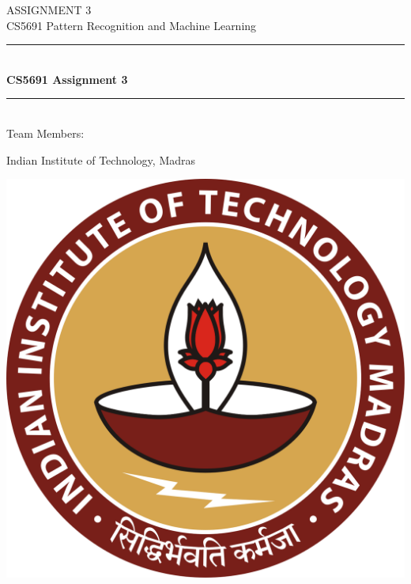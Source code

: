 \documentclass[11pt,a4paper]{article}
\begin{document}
	\begin{titlepage} 
		\begin{center}
		\large{ASSIGNMENT 3}\\
		\vspace{2em}
		\large {CS5691 Pattern Recognition and Machine Learning}
		\vspace{3em}
		
		\rule{0.9\linewidth}{0.5mm} \\[0.4cm]
	    {\Large{\bfseries{CS5691 Assignment 3}}} \\
	    \rule{0.9\linewidth}{0.5mm} \\[3 em]	
	    
	    Team Members: \\
	    \vspace{0.5em}
	   	

		\vspace{1em}

		Indian Institute of Technology, Madras\\    
		
		\vspace{5em}    
	    
	    	\includegraphics[scale=0.09]{images/iitmlogo.png}
		\end{center}
	\end{titlepage}
\end{document}
